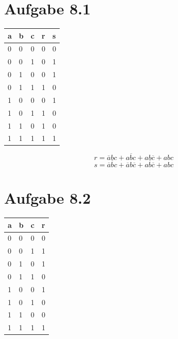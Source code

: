 \documentclass[10pt,a4paper]{article}
\begin{document}
\section*{Aufgabe 8.1}

\begin{tabular}{l|l|l|l|l}
a & b & c & r & s\\ \hline
0 & 0 & 0 & 0 & 0\\ \hline
0 & 0 & 1 & 0 & 1\\ \hline
0 & 1 & 0 & 0 & 1\\ \hline
0 & 1 & 1 & 1 & 0\\ \hline
1 & 0 & 0 & 0 & 1\\ \hline
1 & 0 & 1 & 1 & 0\\ \hline
1 & 1 & 0 & 1 & 0\\ \hline
1 & 1 & 1 & 1 & 1\\ \hline
\end{tabular}

\begin{equation}
r = \overline{a}bc + a\overline{b}c + ab\overline{c} + abc
\end{equation}
\begin{equation}
s = \overline{a}\overline{b}c + \overline{a}b\overline{c} + a\overline{b}\overline{c} + abc
\end{equation}

\section*{Aufgabe 8.2}

\begin{tabular}{l|l|l|l}
a & b & c & r\\ \hline
0 & 0 & 0 & 0\\ \hline
0 & 0 & 1 & 1\\ \hline
0 & 1 & 0 & 1\\ \hline
0 & 1 & 1 & 0\\ \hline
1 & 0 & 0 & 1\\ \hline
1 & 0 & 1 & 0\\ \hline
1 & 1 & 0 & 0\\ \hline
1 & 1 & 1 & 1\\ \hline
\end{tabular}
\end{document}
